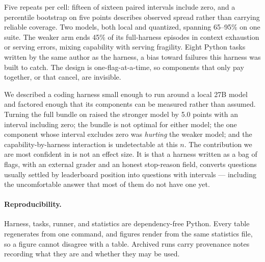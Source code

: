 \documentclass[10pt]{article}
\begin{document}
Five repeats per cell: fifteen of sixteen paired intervals include zero, and a percentile
bootstrap on five points describes observed spread rather than carrying reliable coverage. Two
models, both local and quantized, spanning 65--95\% on one suite. The weaker arm ends 45\% of
its full-harness episodes in context exhaustion or serving errors, mixing capability with
serving fragility. Eight Python tasks written by the same author as the harness, a bias toward
failures this harness was built to catch. The design is one-flag-at-a-time, so components that
only pay together, or that cancel, are invisible.

We described a coding harness small enough to run around a local 27B model and factored enough
that its components can be measured rather than assumed. Turning the full bundle on raised the
stronger model by 5.0 points with an interval including zero; the bundle is not optimal for
either model; the one component whose interval excludes zero was \emph{hurting} the weaker
model; and the capability-by-harness interaction is undetectable at this $n$. The contribution
we are most confident in is not an effect size. It is that a harness written as a bag of flags,
with an external grader and an honest stop-reason field, converts questions usually settled by
leaderboard position into questions with intervals --- including the uncomfortable answer that
most of them do not have one yet.

\paragraph{Reproducibility.} Harness, tasks, runner, and statistics are dependency-free Python.
Every table regenerates from one command, and figures render from the same statistics file, so
a figure cannot disagree with a table. Archived runs carry provenance notes recording what they
are and whether they may be used.
\end{document}
